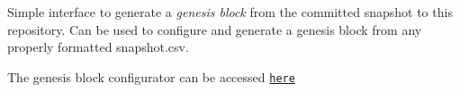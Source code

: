 Simple interface to generate a {\itshape genesis block} from the committed snapshot to this repository. Can be used to configure and generate a genesis block from any properly formatted snapshot.\+csv.

The genesis block configurator can be accessed \href{https://aacio.github.io/genesis/}{\tt here} 